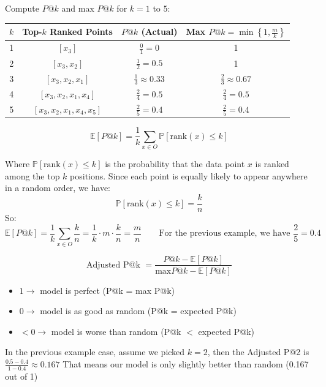 \documentclass{article}
\begin{document}
Compute $P@k$ and max $P@k$ for $k = 1$ to $5$:
\begin{tabular}{|c|c|c|c|}
\hline
$k$ & Top-$k$ Ranked Points & $P@k$ (Actual) & Max $P@k = \min\left\{1, \frac{m}{k} \right\}$ \\
\hline
1 & $[x_3]$ & $\frac{0}{1} = 0$ & 1 \\
2 & $[x_3, x_2]$ & $\frac{1}{2} = 0.5$ & 1 \\
3 & $[x_3, x_2, x_1]$ & $\frac{1}{3} \approx 0.33$ & $\frac{2}{3} \approx 0.67$ \\
4 & $[x_3, x_2, x_1, x_4]$ & $\frac{2}{4} = 0.5$ & $\frac{2}{4} = 0.5$ \\
5 & $[x_3, x_2, x_1, x_4, x_5]$ & $\frac{2}{5} = 0.4$ & $\frac{2}{5} = 0.4$ \\
\hline
\end{tabular}


\[
\mathbb{E}[P@k] = \frac{1}{k} \sum_{x \in O} \mathbb{P}[\text{rank}(x) \leq k] 
\]

Where $\mathbb{P}[\text{rank}(x) \leq k]$ is the probability that the data point $x$ is ranked among the top $k$ positions. Since each point is equally likely to appear anywhere in a random order, we have:
\[
\mathbb{P}[\text{rank}(x) \leq k] = \frac{k}{n}
\]
So:
\[
\mathbb{E}[P@k] = \frac{1}{k} \sum_{x \in O} \frac{k}{n} = \frac{1}{k} \cdot m \cdot \frac{k}{n} = \frac{m}{n} \qquad
\text{For the previous example, we have }\frac{2}{5} = 0.4
\]

\[
\text{Adjusted P@k }= \frac{P@k - \mathbb{E}[P@k]}{\text{max}P@k - \mathbb{E}[P@k]}
\]
\begin{itemize}
    \item $1 \to$ model is perfect (P@k = max P@k)
    \item $0 \to$ model is as good as random (P@k = expected P@k)
    \item $<0 \to$ model is worse than random (P@k $<$ expected P@k) 
\end{itemize}
In the previous example case, assume we picked $k=2$, then the Adjusted P@2 is $\frac{0.5 - 0.4}{1 - 0.4} \approx 0.167$ That means our model is only slightly better than random (0.167 out of 1)
\end{document}
